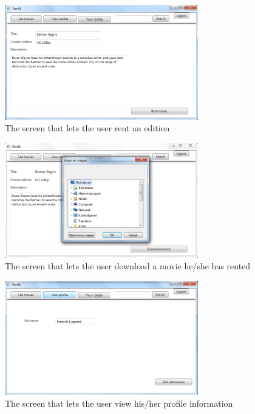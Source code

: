 \begin{figure}[h!]
  \centering
    \includegraphics[width=0.75\textwidth]{Parts/Appendix/Images/RentEdition}
  \caption{The screen that lets the user rent an edition}
  \label{fig:Appendix_GUI_PrototypeRent}
\end{figure}

\begin{figure}[h!]
  \centering
    \includegraphics[width=0.75\textwidth]{Parts/Appendix/Images/Downloadmovie}
  \caption{The screen that lets the user download a movie he/she has rented}
  \label{fig:Appendix_GUI_PrototypeDownload}
\end{figure}

\begin{figure}[h!]
  \centering
    \includegraphics[width=0.75\textwidth]{Parts/Appendix/Images/Viewprofile}
  \caption{The screen that lets the user view his/her profile information}
  \label{fig:Appendix_GUI_PrototypeViewprofile}
\end{figure}

